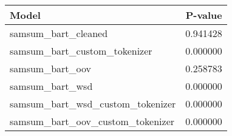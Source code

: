 \begin{tabular}{lr}
\toprule
Model & P-value \\
\midrule
samsum_bart_cleaned & 0.941428 \\
samsum_bart_custom_tokenizer & 0.000000 \\
samsum_bart_oov & 0.258783 \\
samsum_bart_wsd & 0.000000 \\
samsum_bart_wsd_custom_tokenizer & 0.000000 \\
samsum_bart_oov_custom_tokenizer & 0.000000 \\
\bottomrule
\end{tabular}
